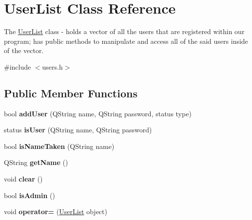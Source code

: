 \hypertarget{class_user_list}{}\section{User\+List Class Reference}
\label{class_user_list}


The \hyperlink{class_user_list}{User\+List} class -\/ holds a vector of all the users that are registered within our program; has public methods to manipulate and access all of the said users inside of the vector.  




{\ttfamily \#include $<$users.\+h$>$}

\subsection*{Public Member Functions}
\begin{DoxyCompactItemize}
\item 
\mbox{\label{class_user_list_a29ccf809d370161ad09cb368f5f86225}} 
bool {\bfseries add\+User} (Q\+String name, Q\+String password, status type)
\item 
\mbox{\label{class_user_list_a0f4aa37cd9e092f3340230d23c05351c}} 
status {\bfseries is\+User} (Q\+String name, Q\+String password)
\item 
\mbox{\label{class_user_list_a672e71d7b506af38fac426e1a89bac12}} 
bool {\bfseries is\+Name\+Taken} (Q\+String name)
\item 
\mbox{\label{class_user_list_adfeaf3c0124c4be06a3aee5ca1a13787}} 
Q\+String {\bfseries get\+Name} ()
\item 
\mbox{\label{class_user_list_af9efb44315d50bd6e9cb9543864aad93}} 
void {\bfseries clear} ()
\item 
\mbox{\label{class_user_list_a8cf28059858132227f105018325d20fd}} 
bool {\bfseries is\+Admin} ()
\item 
\mbox{\label{class_user_list_ac6d715a9fe6550170cf08473e98fe31a}} 
void {\bfseries operator=} (\hyperlink{class_user_list}{User\+List} object)
\end{DoxyCompactItemize}



